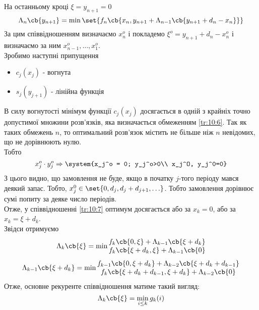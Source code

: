 На останньому кроці $\xi = y_{n+1} =0 $\\
\begin{equation}
	\Lambda_n\cb{y_{n+1}} = \min \set{ f_n \cb{x_n,y_{n+1} + \Lambda_{n-1}\cb{y_{n+1}+d_n - x_n} }}
\end{equation}
За цим співвідношенням визначаємо $x_n^o$ і покладемо $\xi^o = y_{n+1} + d_n - x_n^o$ і визначаємо за ним $x_{n-1}^o,\ldots,x_1^o$.\\
Зробимо наступні припущення
\begin{itemize}
	\item $c_j(x_j)$ - вогнута 
	\item $s_j(y_{j+1})$ - лінійна функція
\end{itemize}
В силу вогнутості мінімум функції $c_j(x_j)$ досягається в одній з крайніх точно допустимої множини розв’язків, яка визначається обмеженням \eqref{tr:10:6}. Так як таких обмежень $n$, то оптимальний розв’язок містить не більше ніж $n$ невідомих, що не дорівнюють нулю.\\
Тобто
\begin{equation}
	x_j^o \cdot y_j^o \Rightarrow\system{x_j^o = 0; y_j^o>0\\ x_j^O, y_j^0=0}
\end{equation}
З цього видно, що замовлення не буде, якщо в початку $j$-того періоду мався деякий запас. Тобто, $x_j^0\in\set{0,d_j,d_j+d_{j+1},\ldots}$. Тобто замовлення дорівнює сумі попиту за деяке число періодів.\\
Отже, у співвідношенні \eqref{tr:10:7} оптимум досягається або за $x_k=0$, або за $x_k = \xi + d_k$. \\
Звідси отримуємо
\begin{equation}
	\Lambda_k\cb{\xi} = \min \begin{matrix}
	f_k \cb{0,\xi} + \Lambda_{k-1} \cb{\xi+d_k} \\
	f_k\cb{\xi+d_k,\xi} + \Lambda_{k-1}\cb{0}
	\end{matrix}
\end{equation}
\begin{equation}
	\Lambda_{k-1}\cb{\xi+d_k} = \min \begin{matrix}
	f_{k-1} \cb{0,\xi+d_k} + \Lambda_{k-2} \cb{\xi+d_k+d_{k-1}} \\
	f_k\cb{\xi+d_k+d_{k-1},\xi+d_k} + \Lambda_{k-2}\cb{0}
	\end{matrix}
\end{equation}
Отже, основне рекуренте співвідношення матиме такий вигляд:
\begin{equation}
	\Lambda_k\cb{\xi} = \min\limits_{i\leq k} g_k(i)
\end{equation}
